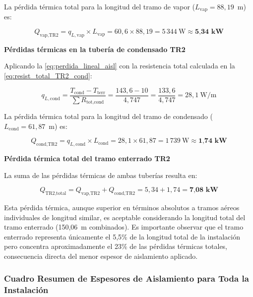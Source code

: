 La pérdida térmica total para la longitud del tramo de vapor ($L_{\text{vap}} = 88{,}19$~m) es:

\begin{equation}
	Q_{\text{vap,TR2}} = q_{L,\text{vap}} \times L_{\text{vap}} = 60{,}6 \times 88{,}19 = 5\,344~\text{W} \approx \textbf{5{,}34~kW}
	\label{eq:perdida_total_TR2_vap}
\end{equation}

\textbf{Pérdidas térmicas en la tubería de condensado TR2}

Aplicando la \eqref{eq:perdida_lineal_aisl} con la resistencia total calculada en la \eqref{eq:resist_total_TR2_cond}:

\begin{equation}
	q_{L,\text{cond}} = \frac{T_{\text{cond}} - T_{\text{terr}}}{\sum R_{\text{tot,cond}}} = \frac{143{,}6 - 10}{4{,}747} = \frac{133{,}6}{4{,}747} = 28{,}1~\text{W/m}
	\label{eq:perdida_lineal_TR2_cond}
\end{equation}

La pérdida térmica total para la longitud del tramo de condensado ($L_{\text{cond}} = 61{,}87$~m) es:

\begin{equation}
	Q_{\text{cond,TR2}} = q_{L,\text{cond}} \times L_{\text{cond}} = 28{,}1 \times 61{,}87 = 1\,739~\text{W} \approx \textbf{1{,}74~kW}
	\label{eq:perdida_total_TR2_cond}
\end{equation}

\textbf{Pérdida térmica total del tramo enterrado TR2}

La suma de las pérdidas térmicas de ambas tuberías resulta en:

\begin{equation}
	Q_{\text{TR2,total}} = Q_{\text{vap,TR2}} + Q_{\text{cond,TR2}} = 5{,}34 + 1{,}74 = \textbf{7{,}08~kW}
	\label{eq:perdida_total_TR2}
\end{equation}

Esta pérdida térmica, aunque superior en términos absolutos a tramos aéreos individuales de longitud similar, es aceptable considerando la longitud total del tramo enterrado (150{,}06~m combinados). Es importante observar que el tramo enterrado representa únicamente el 5{,}5\% de la longitud total de la instalación pero concentra aproximadamente el 23\% de las pérdidas térmicas totales, consecuencia directa del menor espesor de aislamiento aplicado.


\subsubsection{Cuadro Resumen de Espesores de Aislamiento para Toda la Instalación}
\label{subsubsec:resumen_aislamiento}

